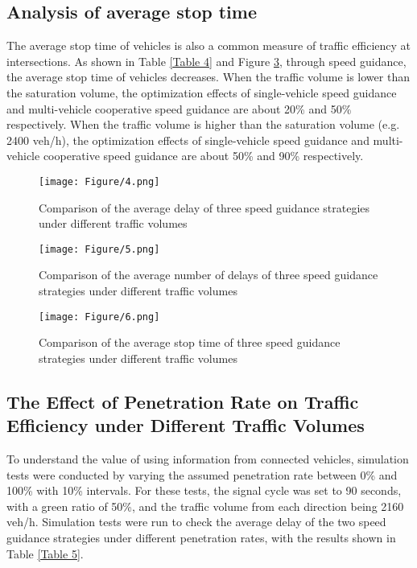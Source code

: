 \documentclass[10.5pt,compsoc]{TsT}
\theoremstyle{mystyle}
\begin{document}
{\subsection{Analysis of average stop time}
\noindent
The average stop time of vehicles is also a common measure of traffic
efficiency at intersections. As shown in Table \ref{Table 4} and Figure \ref{Figure 6}, through
speed guidance, the average stop time of vehicles decreases. When the
traffic volume is lower than the saturation volume, the optimization
effects of single-vehicle speed guidance and multi-vehicle cooperative
speed guidance are about 20\% and 50\% respectively. When the traffic
volume is higher than the saturation volume (e.g. 2400 veh/h), the
optimization effects of single-vehicle speed guidance and multi-vehicle
cooperative speed guidance are about 50\% and 90\% respectively.
\begin{figure}
\centering
\texttt{[image: Figure/4.png]}
\caption{Comparison of the average delay of three speed guidance
strategies under different traffic volumes}
\label{Figure 4}
\end{figure}\begin{figure}\centering
\texttt{[image: Figure/5.png]}
\caption{Comparison of the average number of delays of three speed
guidance strategies under different traffic volumes}
\label{Figure 5}
\end{figure}\begin{figure}\centering
\texttt{[image: Figure/6.png]}
\caption{Comparison of the average stop time of three speed guidance
strategies under different traffic volumes}
\label{Figure 6}
\end{figure} 
\noindent
\subsection{The Effect of Penetration Rate on Traffic Efficiency under
  Different Traffic Volumes}
\noindent
To understand the value of using information from connected vehicles,
simulation tests were conducted by varying the assumed penetration rate
between 0\% and 100\% with 10\% intervals. For these tests, the signal
cycle was set to 90 seconds, with a green ratio of 50\%, and the traffic
volume from each direction being 2160 veh/h. Simulation tests were run
to check the average delay of the two speed guidance strategies under
different penetration rates, with the results shown in Table \ref{Table 5}.

}
\end{document}
